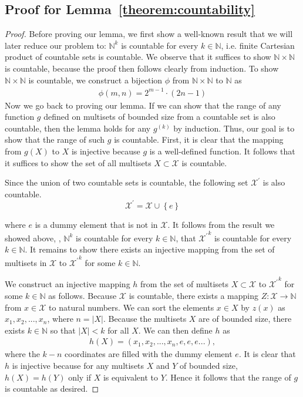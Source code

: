 \begin{appendix}
\section{Proof for Lemma~\ref{theorem:countability}} 
\begin{proof}
Before proving our lemma, we first show a well-known result that we will later reduce our problem to: $\mathbb{N}^k$ is countable for every $k \in \mathbb{N}$, i.e. finite Cartesian product of countable sets is countable. We observe that it suffices to show $\mathbb{N} \times \mathbb{N}$ is countable, because the proof then follows clearly from induction. To show $\mathbb{N} \times \mathbb{N}$ is countable, we construct a bijection $\phi$ from $\mathbb{N} \times \mathbb{N}$ to $\mathbb{N}$ as 
\begin{align*}
\phi\left(m, n\right) = 2^{m-1} \cdot \left( 2n - 1 \right)
\end{align*}
Now we go back to proving our lemma. If we can show that the range of any function $g$ defined on multisets of bounded size from a countable set is also countable, then the lemma holds for any $g^{(k)}$ by induction. Thus, our goal is to show that the range of such $g$ is countable. First, it is clear that the mapping from $g(X)$ to $X$ is injective because $g$ is a well-defined function. It follows that it suffices to show the set of all multisets $X \subset \mathcal{X}$ is countable. 

Since the union of two countable sets is countable, the following set $\mathcal{X}^{\prime}$ is also countable. 
\[\mathcal{X}^{\prime} = \mathcal{X} \cup \left\lbrace e \right\rbrace\] 

where $e$ is a dummy element that is not in $\mathcal{X}$. It follows from the result we showed above, \ie, $\mathbb{N}^k$ is countable for every $k \in \mathbb{N}$, that ${\mathcal{X}^{\prime}}^k$ is countable for every $k \in \mathbb{N}$. It remains to show there exists an injective mapping from the set of multisets in $\mathcal{X}$ to  ${\mathcal{X}^{\prime}}^k$ for some $k\in \mathbb{N}$. 

We construct an injective mapping $h$ from the set of multisets $X \subset \mathcal{X}$ to ${\mathcal{X}^{\prime}}^k$  for some $k \in \mathbb{N}$ as follows. Because $\mathcal{X}$ is countable, there exists a mapping $Z: \mathcal{X} \rightarrow \mathbb{N}$ from $x \in \mathcal{X}$ to natural numbers. We can sort the elements $x \in X$ by $z(x)$ as $x_1, x_2, ..., x_n$, where $n = |X|$. Because the multisets $X$ are of bounded size, there exists $k \in \mathbb{N}$ so that $|X| < k$ for all $X$. We can then define $h$ as
\begin{align*}
h\left( X \right) = \left(x_1, x_2, ..., x_n, e, e, e... \right),
\end{align*}
where the $k - n$ coordinates are filled with the dummy element $e$. It is clear that $h$ is injective because for any multisets $X$ and $Y$ of bounded size, $h(X) = h(Y)$ only if $X$ is equivalent to $Y$. Hence it follows that the range of $g$ is countable as desired.


\end{proof}
\end{appendix}
